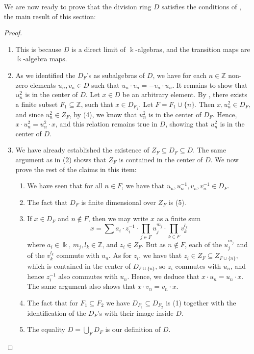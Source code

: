 \documentclass{amsart}
\theoremstyle{definition}
\renewcommand{\k}{\Bbbk}
\numberwithin{equation}{section}
\begin{document}
We are now ready to prove that the division ring $D$ satisfies the conditions of ,
the main result of this section:
\begin{proof}\quad
\begin{enumerate}
\item This is because $D$ is a direct limit of $\k$-algebras,
and the transition maps are $\k$-algebra maps.
\item As we identified the $D_F$'s as subalgebras of $D$,
we have for each $n \in \mathbb{Z}$ non-zero elements $u_n, v_n \in D$ such that $u_n \cdot v_n = -v_n\cdot u_n$. It remains to show that $u_n^2$ is in the center of $D$.
Let $x \in D$ be an arbitrary element.
By ,
there exists a finite subset $F_1 \subseteq \mathbb{Z}$,
such that $x \in D_{F_1}$.
Let $F = F_1 \cup \{n\}$.
Then $x, u_n^2 \in D_F$,
and since $u_n^2 \in Z_F$, by (4),
we know that $u_n^2$ is in the center of $D_F$.
Hence, $x\cdot u_n^2 = u_n^2\cdot x$,
and this relation remains true in $D$,
showing that $u_n^2$ is in the center of $D$.
\item We have already established the existence of $Z_F \subseteq D_F \subseteq D$. The same argument as in (2) shows that $Z_F$ is contained in the center of $D$. We now prove the rest of the claims in this item:
\begin{enumerate}
\item We have seen that for all $n \in F$, we have that $u_n,u_n^{-1},v_n,v_n^{-1} \in D_F$.
\item The fact that $D_F$ is finite dimensional over $Z_F$ is (5).
\item If $x \in D_F$ and $n \notin F$,
then we may write $x$ as a finite sum
\[
x = \sum a_i \cdot z_i^{-1} \cdot \prod_{j \in F} u_j^{m_j}  \cdot \prod_{k \in F}  v_k^{l_k}  
\]
where $a_i\in \k$, $m_j, l_k \in \mathbb{Z}$,
and $z_i \in Z_F$.
But as $n \notin F$,
each of the $u_j^{m_j}$ and of the $v_k^{l_k}$ commute with $u_n$.
As for $z_i$, 
we have that $z_i \in Z_F \subseteq Z_{F \cup \{n\}}$,
which is contained in the center of $D_{F\cup\{n\}}$,
so $z_i$ commutes with $u_n$,
and hence $z_i^{-1}$ also commutes with $u_n$.
Hence, we deduce that $x\cdot u_n = u_n \cdot x$.
The same argument also shows that $x\cdot v_n = v_n \cdot x$.
\item The fact that for $F_1 \subseteq F_2$ we have $D_{F_1} \subseteq D_{F_2}$ is (1) together with the identification of the $D_F$'s with their image inside $D$.
\item The equality $D = \bigcup_F D_F$ is our definition of $D$.

\end{enumerate}
\end{enumerate}
\end{proof}
\end{document}
